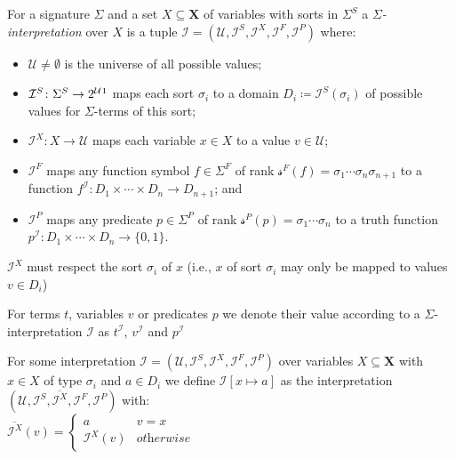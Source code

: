 \begin{definition}
For a signature $\Sigma$ and a set $X\subseteq\mathbf{X}$ of variables with sorts in $\Sigma^S$ a \textit{$\Sigma$-interpretation} over $X$ is a tuple
$\mathcal{I}=\left(\mathcal{U},\mathcal{I}^S, \mathcal{I}^X, \mathcal{I}^F, \mathcal{I}^P\right)$
where:
\begin{itemize}
    \item $\mathcal{U}\neq\emptyset$ is the universe of all possible values;
    \item $\mathcal{I}^S\colon\Sigma^S\to2^\mathcal{U}\footnotemark$ 
        maps each sort $\sigma_i$ to a domain $D_i\coloneqq\mathcal{I}^S\left(\sigma_i\right)$ of possible values for $\Sigma$-terms of this sort;
    \item $\mathcal{I}^X\colon X\to \mathcal{U}$ maps each variable $x\in X$ to a value $v\in\mathcal{U}$;
    \item $\mathcal{I}^F$ maps any function symbol $f\in\Sigma^F$ of rank  $\mathcal{s}^F\left(f\right)=\sigma_1\dotsi\sigma_n\sigma_{n+1}$ to a function $f^\mathcal{I}\colon D_1\times\dotsi\times D_n \to D_{n+1}$; and
    \item $\mathcal{I}^P$ maps any predicate $p\in\Sigma^P$ of rank $\mathcal{s}^P\left(p\right)=\sigma_1\dotsi\sigma_n$ to a truth function $p^\mathcal{I}\colon D_1\times\dotsi\times D_n \to \{0,1\}$.
\end{itemize}
$\mathcal{I}^X$ must respect the sort $\sigma_i$ of $x$ (i.e., $x$ of sort $\sigma_i$ may only be mapped to values $v\in D_i$)
\end{definition}
For terms $t$, variables $v$ or predicates $p$ we denote their value according to a $\Sigma$-interpretation $\mathcal{I}$ as $t^\mathcal{I}$, $v^\mathcal{I}$ and $p^\mathcal{I}$

\begin{definition}[Substitution]
For some interpretation $\mathcal{I}=\left(\mathcal{U},\mathcal{I}^S, \mathcal{I}^X, \mathcal{I}^F, \mathcal{I}^P\right)$ over variables $X\subseteq\mathbf{X}$ with $x\in X$ of type $\sigma_i$ and $a\in D_i$ we define $\mathcal{I}\left[x\mapsto a\right]$ as the interpretation $\left(\mathcal{U},\mathcal{I}^S, \overline{\mathcal{I}^X}, \mathcal{I}^F, \mathcal{I}^P\right)$ with:\\
$\overline{\mathcal{I}^X}(v)=
\begin{cases}
a & v=x\\
\mathcal{I}^X(v) & \textit{otherwise}
\end{cases}$
\end{definition}

